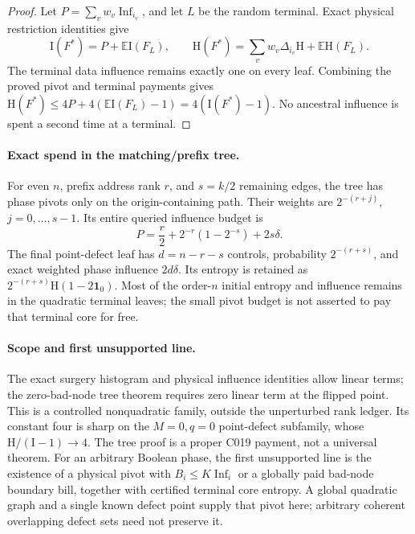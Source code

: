 \documentclass[11pt]{article}
\newcommand{\I}{\mathrm I}
\newcommand{\Ent}{\mathrm H}
\begin{document}
\begin{proof}
Let $P=\sum_vw_v\operatorname{Inf}_{i_v}$, and let $L$ be the
random terminal. Exact physical restriction identities give
\[
 \I(F^*)=P+\mathbb E\I(F_L),\qquad
 \Ent(F^*)=\sum_vw_v\Delta_{i_v}\Ent+\mathbb E\Ent(F_L).
\]
The terminal data influence remains exactly one on every leaf.
Combining the proved pivot and terminal payments gives
$\Ent(F^*)\le4P+4(\mathbb E\I(F_L)-1)=4(\I(F^*)-1)$.
No ancestral influence is spent a second time at a terminal.
\end{proof}

\paragraph{Exact spend in the matching/prefix tree.}
For even $n$, prefix address rank $r$, and $s=k/2$ remaining edges,
the tree has phase pivots only on the origin-containing path.
Their weights are $2^{-(r+j)}$, $j=0,\ldots,s-1$.
Its entire queried influence budget is
\[
 P=\frac r2+2^{-r}(1-2^{-s})+2s\delta.
\]
The final point-defect leaf has $d=n-r-s$ controls, probability
$2^{-(r+s)}$, and exact weighted phase influence $2d\delta$.
Its entropy is retained as $2^{-(r+s)}\Ent(1-2\mathbf1_0)$.
Most of the order-$n$ initial entropy and influence remains in the
quadratic terminal leaves; the small pivot budget is not asserted to
pay that terminal core for free.

\paragraph{Scope and first unsupported line.}
The exact surgery histogram and physical influence identities allow
linear terms; the zero-bad-node tree theorem requires zero linear term
at the flipped point. This is a controlled nonquadratic family, outside
the unperturbed rank ledger. Its constant four is sharp on the
$M=0,q=0$ point-defect subfamily, whose $\Ent/(\I-1)\to4$.
The tree proof is a proper C019 payment, not a universal theorem.
For an arbitrary Boolean phase, the first unsupported line is the
existence of a physical pivot with $B_i\le K\operatorname{Inf}_i$
or a globally paid bad-node boundary bill, together with certified
terminal core entropy. A global quadratic graph and a single known
defect point supply that pivot here; arbitrary coherent overlapping
defect sets need not preserve it.
\end{document}

